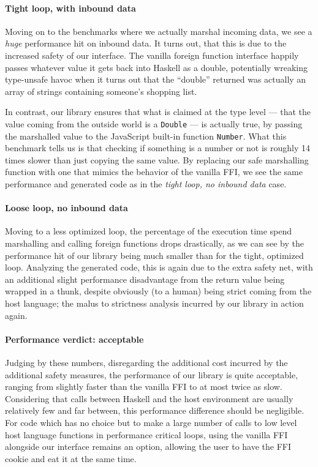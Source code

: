 \documentclass[preprint]{sigplanconf}
\begin{document}
\paragraph{Tight loop, with inbound data}
Moving on to the benchmarks where we actually marshal incoming data, we see a
\emph{huge} performance hit on inbound data. It turns out, that this is due to
the increased safety of our interface. The vanilla foreign function
interface happily passes whatever value it gets back into Haskell as a double,
potentially wreaking type-unsafe havoc when it turns out that the ``double''
returned was actually an array of strings containing someone's shopping list.

In contrast, our library ensures that what is claimed at the type level --- that
the value coming from the outside world is a \lstinline!Double! --- is actually
true, by passing the marshalled value to the JavaScript built-in function
\lstinline!Number!. What this benchmark tells us is that checking if something
is a number or not is roughly 14 times slower than just copying the same value.
By replacing our safe marshalling function with one that mimics the behavior
of the vanilla FFI, we see the same performance and generated code as in the
\emph{tight loop, no inbound data} case.

\paragraph{Loose loop, no inbound data}
Moving to a less optimized loop, the percentage of the execution time spend
marshalling and calling foreign functions drops drastically, as we can see by
the performance hit of our library being much smaller than for the tight,
optimized loop. Analyzing the generated code, this is again due to the extra
safety net, with an additional slight performance disadvantage from the return
value being wrapped in a thunk, despite obviously (to a human) being strict
coming from the host language; the malus to strictness analysis incurred by
our library in action again.

\paragraph{Performance verdict: acceptable}
Judging by these numbers, disregarding the additional cost incurred by the
additional safety measures, the performance of our library is quite acceptable,
ranging from slightly faster than the vanilla FFI to at most twice as slow.
Considering that calls between Haskell and the host environment are usually
relatively few and far between, this performance difference should be
negligible. For code which has no choice but to make a large number of calls to
low level host language functions in performance critical loops,
using the vanilla FFI alongside our interface remains an option,
allowing the user to have the FFI cookie and eat it at the same time.
\end{document}

